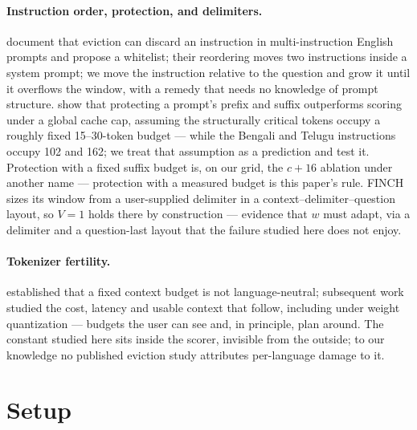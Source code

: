 \documentclass{article}
\begin{document}
\paragraph{Instruction order, protection, and delimiters.}
\citet{chen2026instruction} document that eviction can discard an
instruction in multi-instruction English prompts and propose a
whitelist; their reordering moves two instructions inside
a system prompt; we move the instruction relative to the question and
grow it until it overflows the window, with a remedy that needs no
knowledge of prompt structure.
\citet{garcia2026protection} show that protecting a prompt's prefix and
suffix outperforms scoring under a global cache cap, assuming the
structurally critical tokens occupy a roughly fixed 15--30-token budget
--- while the Bengali and Telugu instructions occupy 102 and 162; we
treat that assumption as a prediction and test it. Protection with a
fixed suffix budget is, on our grid, the $c{+}16$ ablation under
another name --- protection with a measured budget is this paper's
rule. FINCH \citep{corallo2024finch} sizes its window from a
user-supplied delimiter in a context--delimiter--question layout, so
$V{=}1$ holds there by construction --- evidence that $w$ must adapt,
via a delimiter and a question-last layout that the failure studied
here does not enjoy.

\paragraph{Tokenizer fertility.}
\citet{petrov2023language} established that a fixed context budget is not
language-neutral; subsequent work studied the cost, latency and
usable context that follow, including under weight quantization
\citep{marchisio2024multilingual,marie2025lowbit} --- budgets the
user can see and, in principle, plan around. The constant studied here
sits inside the scorer, invisible from the outside; to our
knowledge no published eviction study attributes per-language damage
to it.

\section{Setup}
\label{sec:setup}
\end{document}
